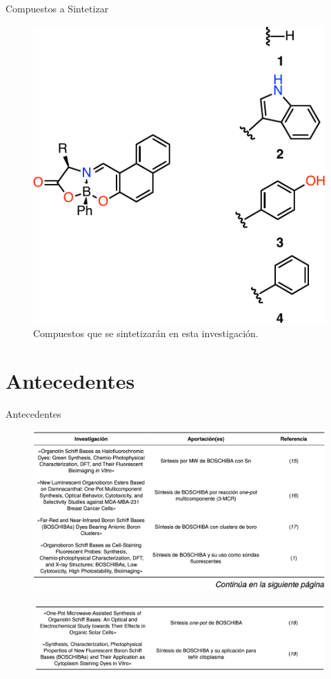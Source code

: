 \documentclass[%
spanish,
mexico]{beamer}
\begin{document}
\begin{frame}{Compuestos a Sintetizar}
    \begin{figure}
        \centering
        \includegraphics[width=0.5\linewidth]{./Figuras/Marcha.pdf}
        \caption{Compuestos que se sintetizarán en esta investigación.}
        \label{sch:marcha}
    \end{figure}
\end{frame}

\section{Antecedentes}
\begin{frame}[allowframebreaks]{Antecedentes}
\begin{figure}
    \includegraphics[width=0.95\linewidth]{./Figuras/t1.png}
\end{figure}
\framebreak
\begin{figure}
    \includegraphics[width=0.95\linewidth]{./Figuras/t2.png}
\end{figure}
\end{frame}
\end{document}
